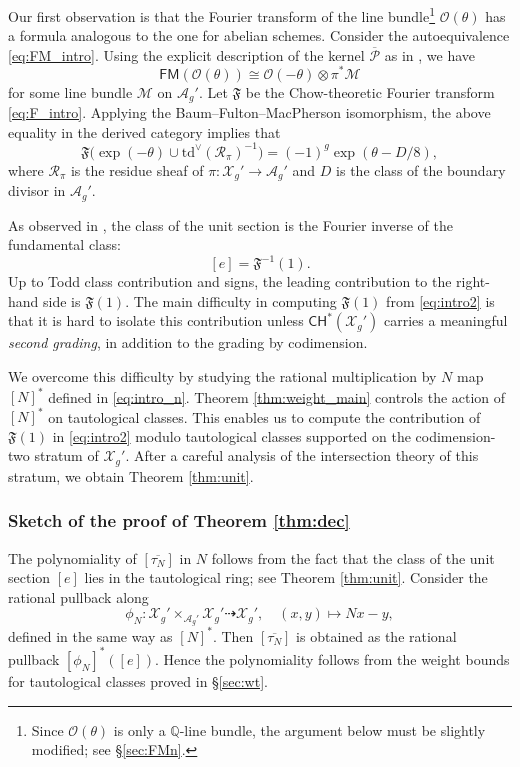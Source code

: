\documentclass[11pt]{article}
\def\Mc{\mathcal{M}}
\def\CH{\mathsf{CH}}
\def\CO{\mathcal{O}}
\def\A{\mathcal{A}}
\def\X{\mathcal{X}}
\def\QQ{\mathbb{Q}}
\def\Td{\mathrm{td}}
\def\fm{\mathfrak{F}}
\def\Pbar{\overline{\mathcal{P}}}
\def\cR{\mathcal{R}}
\def\FM{\mathsf{FM}}
\theoremstyle{definition}
\begin{document}
Our first observation is that the Fourier transform of the line bundle\footnote{Since $\CO(\theta)$ is only a $\QQ$-line bundle, the argument below must be slightly modified; see \S\ref{sec:FMn}.} $\CO(\theta)$ has a formula analogous to the one for abelian schemes. Consider the autoequivalence
\eqref{eq:FM_intro}. Using the explicit description of the kernel $\Pbar$ as in \cite{BMP}, we have
\begin{equation*}
    \FM (\CO(\theta))
    \cong
    \CO(-\theta) \otimes \pi^*\Mc
\end{equation*}
for some line bundle $\Mc$ on $\A_g'$. Let $\fm$ be the Chow-theoretic Fourier transform \eqref{eq:F_intro}. Applying the Baum--Fulton--MacPherson isomorphism, the above equality in the derived category implies that
\begin{equation}\label{eq:intro2}
    \fm\bigl(\exp(-\theta)\cup \Td^\vee(\cR_\pi)^{-1}\bigr)
    =
	(-1)^g\exp(\theta-D/8),
\end{equation}
where $\cR_\pi$ is the residue sheaf of $\pi :\X_g'\to \A_g'$ and $D$ is the class of the boundary divisor in $\A_g'$.

As observed in \cite{BMP}, the class of the unit section is the Fourier inverse
of the fundamental class:
\[
[e] = \fm^{-1}(1).
\]
Up to Todd class contribution and signs, the leading contribution to the right-hand side is $\fm(1)$. The main difficulty in computing $\fm(1)$ from
\eqref{eq:intro2} is that it is hard to isolate this contribution unless $\CH^*(\X_g')$ carries a meaningful {\em second grading}, in addition to the grading by codimension.

We overcome this difficulty by studying the rational multiplication by $N$ map $[N]^{\ast}$ defined in \eqref{eq:intro_n}. Theorem \ref{thm:weight_main} controls the action of $[N]^{\ast}$ on tautological classes. This enables
us to compute the contribution of $\fm(1)$ in \eqref{eq:intro2} modulo tautological classes supported on the codimension-two stratum of $\X_g'$.
After a careful analysis of the intersection theory of this stratum, we obtain Theorem \ref{thm:unit}.

\subsubsection{Sketch of the proof of Theorem \ref{thm:dec}}

The polynomiality of $[\overline{\tau_N}]$ in $N$ follows from the fact that the class of the unit section $[e]$ lies in the tautological ring; see Theorem
\ref{thm:unit}. Consider the rational pullback along
\[
\phi_N : \X_g' \times_{\A_g'} \X_g' \dashrightarrow \X_g',
\quad
(x,y) \mapsto Nx-y,
\]
defined in the same way as $[N]^*$. Then $[\overline{\tau_N}]$ is obtained as the rational pullback $[\phi_N]^*([e])$. Hence the polynomiality follows from the weight bounds for tautological classes proved in \S\ref{sec:wt}.
\end{document}
